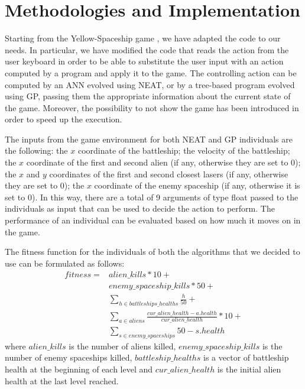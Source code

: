 \section{Methodologies and Implementation}
Starting from the Yellow-Spaceship game \cite{Yellow-Spaceship}, we have adapted the code to our needs.
In particular, we have modified the code that reads the action from the user keyboard in order to be
able to substitute the user input with an action computed by a program and apply it to the game.
The controlling action can be computed by an ANN evolved using NEAT, or by a tree-based program evolved 
using GP, passing them the appropriate information about the current state of the game.
Moreover, the possibility to not show the game has been introduced in order to speed up the execution.

The inputs from the game environment for both NEAT and GP individuals are the following:
the $x$ coordinate of the battleship; the velocity of the battleship;
the $x$ coordinate of the first and second alien (if any, otherwise they are set to 0);
the $x$ and $y$ coordinates of the first and second closest lasers (if any, otherwise they are set to 0);
the $x$ coordinate of the enemy spaceship (if any, otherwise it is set to 0).
In this way, there are a total of 9 arguments of type float passed to the individuals as input that
can be used to decide the action to perform. 
The performance of an individual can be evaluated based on how much it moves on in the game.

The fitness function for the individuals of both the algorithms that we decided to use can be
formulated as follows:
\begin{equation}
\begin{split}
    fitness = & alien\_kills * 10 + \\
              & enemy\_spaceship\_kills * 50 + \\
              & \sum_{h \in battleships\_healths}^{} \frac{h}{50} + \\
              & \sum_{a \in aliens}^{} \frac{cur\_alien\_health - a.health}{cur\_alien\_health} * 10 + \\
              & \sum_{s \in enemy\_spaceships}^{} 50 - s.health
\end{split}
\end{equation}
where $alien\_kills$ is the number of aliens killed, 
$enemy\_spaceship\_kills$ is the number of enemy spaceships killed,
$battleship\_healths$ is a vector of battleship health at the beginning of each level and
$cur\_alien\_health$ is the initial alien health at the last level reached. 


